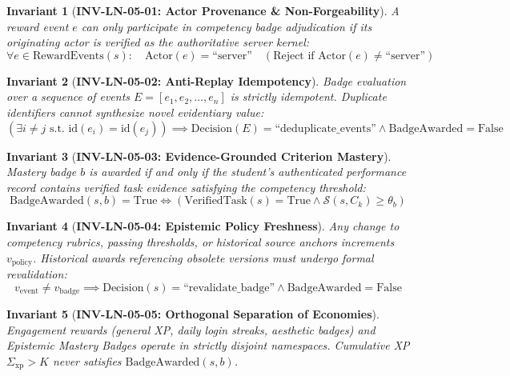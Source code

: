 \documentclass[11pt,a4paper]{article}
\newtheorem{invariant}{Invariant}
\begin{document}
\begin{invariant}[\textbf{INV-LN-05-01: Actor Provenance \& Non-Forgeability}]
A reward event $e$ can only participate in competency badge adjudication if its originating actor is verified as the authoritative server kernel:
\begin{equation}
\forall e \in \text{RewardEvents}(s): \quad \text{Actor}(e) = \text{``server''} \quad (\text{Reject if } \text{Actor}(e) \neq \text{``server''})
\end{equation}
\end{invariant}

\begin{invariant}[\textbf{INV-LN-05-02: Anti-Replay Idempotency}]
Badge evaluation over a sequence of events $E = [e_1, e_2, \dots, e_n]$ is strictly idempotent. Duplicate identifiers cannot synthesize novel evidentiary value:
\begin{equation}
\left( \exists i \neq j \text{ s.t. } \text{id}(e_i) = \text{id}(e_j) \right) \implies \text{Decision}(E) = \text{``deduplicate\_events''} \land \text{BadgeAwarded} = \text{False}
\end{equation}
\end{invariant}

\begin{invariant}[\textbf{INV-LN-05-03: Evidence-Grounded Criterion Mastery}]
Mastery badge $b$ is awarded if and only if the student's authenticated performance record contains verified task evidence satisfying the competency threshold:
\begin{equation}
\text{BadgeAwarded}(s, b) = \text{True} \iff \left( \text{VerifiedTask}(s) = \text{True} \land \mathcal{S}(s, C_k) \ge \theta_{b} \right)
\end{equation}
\end{invariant}

\begin{invariant}[\textbf{INV-LN-05-04: Epistemic Policy Freshness}]
Any change to competency rubrics, passing thresholds, or historical source anchors increments $v_{\text{policy}}$. Historical awards referencing obsolete versions must undergo formal revalidation:
\begin{equation}
v_{\text{event}} \neq v_{\text{badge}} \implies \text{Decision}(s) = \text{``revalidate\_badge''} \land \text{BadgeAwarded} = \text{False}
\end{equation}
\end{invariant}

\begin{invariant}[\textbf{INV-LN-05-05: Orthogonal Separation of Economies}]
Engagement rewards (general XP, daily login streaks, aesthetic badges) and Epistemic Mastery Badges operate in strictly disjoint namespaces. Cumulative XP $\Sigma_{\text{xp}} > K$ never satisfies $\text{BadgeAwarded}(s, b)$.
\end{invariant}
\end{document}
